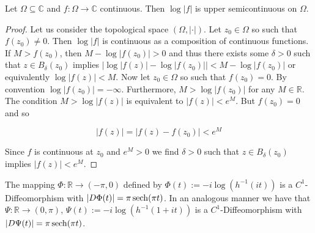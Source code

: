 \begin{lemma}
	Let $\Omega \subseteq \mathbb{C}$ and $f: \Omega \to \mathbb{C}$ continuous. Then $\log\left| f\right|$ is upper semicontinuous on $\Omega$.
\end{lemma}

\begin{proof}
	Let us consider the topological space $\left( \Omega, \left| \cdot\right| \right)$. Let $z_0 \in \Omega$ so such that $f(z_0) \neq 0$. Then $\log\left| f\right|$ is continuous as a composition of continuous functions. If $M > f(z_0)$, then $M - \log\left| f(z_0)\right| > 0$ and thus there exists some $\delta > 0$ such that $z \in B_\delta(z_0)$ implies $\left| \log\left| f(z)\right| - \log\left| f(z_0)\right|\right| < M- \log\left| f(z_0)\right|$ or equivalently $\log\left| f(z)\right| < M$. Now let $z_0 \in \Omega$ so such that $f(z_0) = 0$. By convention $\log\left| f(z_0)\right| = -\infty$. Furthermore, $M > \log\left| f(z_0)\right|$ for any $M \in \mathbb{R}$. The condition $M > \log\left| f(z)\right|$ is equivalent to $\left| f(z)\right| < e^M$. But $f(z_0) = 0$ and so

	\begin{equation*}
		\left| f(z)\right| = \left| f(z) - f(z_0)\right|< e^M
	\end{equation*}

	Since $f$ is continuous at $z_0$ and $e^M > 0$ we find $\delta > 0$ such that $z \in B_\delta(z_0)$ implies $\left| f(z)\right| < e^M$.
\end{proof}

\begin{lemma}
	The mapping $\Phi: \mathbb{R} \rightarrow (-\pi,0)$ defined by $\Phi(t) := -i\log\left( h^{-1}(it) \right)$ is a $C^1$-Diffeomorphism with $\vert D\Phi(t)\vert = \pi \operatorname{sech}(\pi t)$. In an analogous manner we have that $\Psi: \mathbb{R} \rightarrow (0,\pi)$, $\Psi(t) := -i\log\left( h^{-1}(1 + it) \right)$ is a $C^1$-Diffeomorphism with $\vert D\Psi(t)\vert = \pi \operatorname{sech}(\pi t)$.
	\label{lem:change_of_variables}
\end{lemma}

